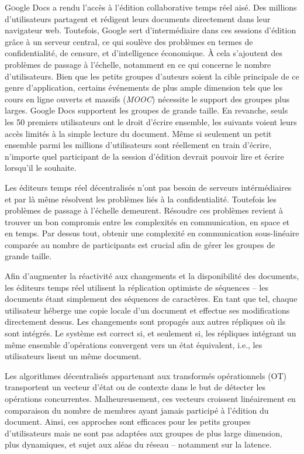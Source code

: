 
\lettrine{G}oogle Docs a rendu l'accès à l'édition collaborative temps réel
aisé. Des millions d'utilisateurs partagent et rédigent leurs documents
directement dans leur navigateur web. Toutefois, Google sert d'intermédiaire
dans ces sessions d'édition grâce à un serveur central, ce qui soulève des
problèmes en termes de confidentialité, de censure, et d'intelligence
économique. À cela s'ajoutent des problèmes de passage à l'échelle, notamment en
ce qui concerne le nombre d'utilisateurs. Bien que les petits groupes d'auteurs
soient la cible principale de ce genre d'application, certains événements de
plus ample dimension tels que les cours en ligne ouverts et massifs
(\emph{MOOC}) nécessite le support des groupes plus larges. Google Docs
supportent les groupes de grande taille. En revanche, seuls les 50 premiers
utilisateurs ont le droit d'écrire ensemble, les suivants voient leurs accès
limités à la simple lecture du document. Même si seulement un petit ensemble
parmi les millions d'utilisateurs sont réellement en train d'écrire, n'importe
quel participant de la session d'édition devrait pouvoir lire et écrire
lorsqu'il le souhaite.

Les éditeurs temps réel décentralisés n'ont pas besoin de serveurs
intérmédiaires et par là même résolvent les problèmes liés à la
confidentialité. Toutefois les problèmes de passage à l'échelle
demeurent. Résoudre ces problèmes revient à trouver un bon compromis entre les
complexités en communication, en space et en temps. Par dessus tout, obtenir une
complexité en communication sous-linéaire comparée au nombre de participants est
crucial afin de gérer les groupes de grande taille.

Afin d'augmenter la réactivité aux changements et la disponibilité des
documents, les éditeurs temps réel utilisent la réplication optimiste de
séquences -- les documents étant simplement des séquences de caractères. En tant
que tel, chaque utilisateur héberge une copie locale d'un document et effectue
ses modifications directement dessus. Les changements sont propagés aux autres
répliques où ils sont intégrés. Le système est correct si, et seulement si, les
répliques intégrant un même ensemble d'opérations convergent vers un état
équivalent, i.e., les utilisateurs lisent un même document.

Les algorithmes décentralisés appartenant aux transformés opérationnels (OT)
transportent un vecteur d'état ou de contexte dans le but de détecter les
opérations concurrentes. Malheureusement, ces vecteurs croissent linéairement en
comparaison du nombre de membres ayant jamais participé à l'édition du
document. Ainsi, ces approches sont efficaces pour les petits groupes
d'utilisateurs mais ne sont pas adaptées aux groupes de plus large dimension,
plus dynamiques, et sujet aux aléas du réseau -- notamment sur la latence.

